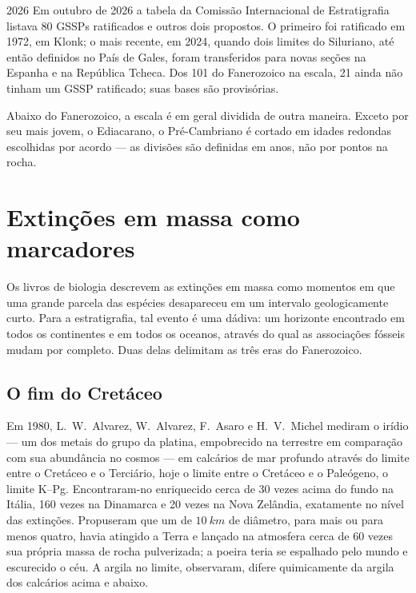 \begin{dated}{2026}
Em outubro de 2026 a tabela da Comissão Internacional de Estratigrafia listava 80 GSSPs
ratificados e outros dois propostos. O primeiro foi ratificado em 1972, em Klonk; o mais
recente, em 2024, quando dois limites do Siluriano, até então definidos no País de Gales, foram
transferidos para novas seções na Espanha e na República Tcheca. Dos 101  do Fanerozoico
na escala, 21 ainda não tinham um GSSP ratificado; suas bases são provisórias.
\end{dated}

Abaixo do Fanerozoico, a escala é em geral dividida de outra maneira. Exceto por seu 
mais jovem, o Ediacarano, o Pré-Cambriano é cortado em idades redondas escolhidas por acordo ---
as divisões são definidas em anos, não por pontos na rocha.

\section{Extinções em massa como marcadores}\label{sec:b1:stratigraphic-scale:extinctions}

Os livros de biologia descrevem as extinções em massa como momentos em que uma grande parcela
das espécies desapareceu em um intervalo geologicamente curto. Para a estratigrafia, tal evento
é uma dádiva: um horizonte encontrado em todos os continentes e em todos os oceanos, através do
qual as associações fósseis mudam por completo. Duas delas delimitam as três eras do
Fanerozoico.

\subsection*{O fim do Cretáceo}

Em 1980, L.~W.~Alvarez, W.~Alvarez, F.~Asaro e H.~V.~Michel mediram o irídio --- um dos metais
do grupo da platina, empobrecido na  terrestre em comparação com sua abundância no
cosmos --- em calcários de mar profundo através do limite entre o Cretáceo e o Terciário, hoje
o limite entre o Cretáceo e o Paleógeno, o limite K--Pg. Encontraram-no enriquecido cerca de 30
vezes acima do fundo na Itália, 160 vezes na Dinamarca e 20 vezes na Nova Zelândia, exatamente
no nível das extinções. Propuseram que um  de $\qty{10}{km}$ de diâmetro, para mais ou
para menos quatro, havia atingido a Terra e lançado na atmosfera cerca de 60 vezes sua própria
massa de rocha pulverizada; a poeira teria se espalhado pelo mundo e escurecido o céu. A argila
no limite, observaram, difere quimicamente da argila dos calcários acima e abaixo.

